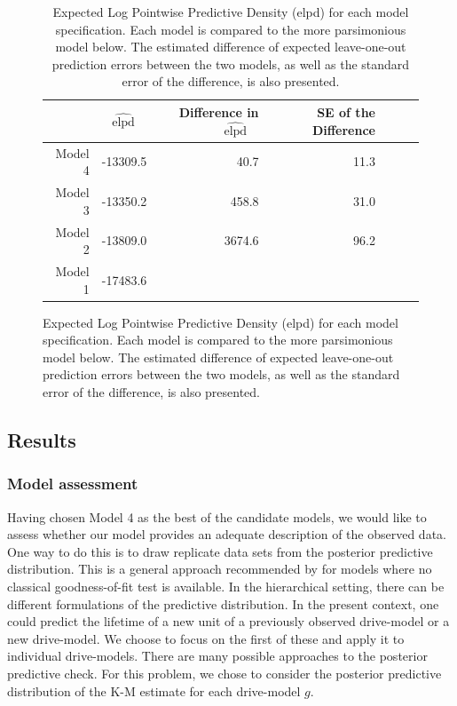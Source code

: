 \documentclass[12pt]{article}
\begin{document}
\begin{figure}
\begin{table}[H]
\centering
\begin{tabular}{rrrrrrr}
  \hline
 & $\widehat{\text{elpd}}$ \ & Difference in $\widehat{\text{elpd}}$ \ & SE of the Difference \\ 
  \hline
Model 4 & -13309.5 & 40.7 & 11.3 \\ 
Model 3 & -13350.2 & 458.8 & 31.0  \\ 
Model 2 & -13809.0 & 3674.6 & 96.2 \\ 
Model 1 & -17483.6  \\ 
   \hline
\end{tabular}
\caption{Expected Log Pointwise Predictive Density (elpd) for each model specification.  Each model is compared to the more parsimonious model below.  The estimated difference of expected leave-one-out prediction errors between the two models, as well as the standard error of the difference, is also presented.}
\label{table:2}
\end{table}
\end{figure}

\subsection{Results}
\subsubsection{Model assessment}
\label{model-assessment}
Having chosen Model 4 as the best of the candidate models, we would like to assess whether our model provides an adequate description of the observed data. One way to do this is to draw replicate data sets from the posterior predictive distribution. This is a general approach recommended by \cite{gelman1996postpred} for models where no classical goodness-of-fit test is available. In the hierarchical setting, there can be different formulations of the predictive distribution. In the present context, one could predict the lifetime of a new unit of a previously observed drive-model or a new drive-model. We choose to focus on the first of these and apply it to individual drive-models.  There are many possible approaches to the posterior predictive check. For this problem, we chose to consider the posterior predictive distribution of the K-M estimate for each drive-model $g$.

\end{document}
